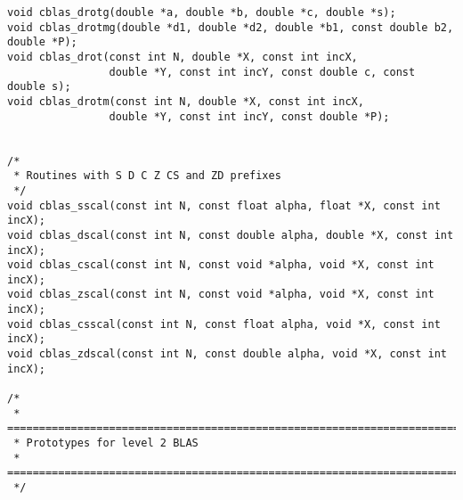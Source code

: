 \documentclass{article}
\begin{document}
\begin{Verbatim}[fontsize=\small,fontfamily=tt,fontshape=rm]
void cblas_drotg(double *a, double *b, double *c, double *s);
void cblas_drotmg(double *d1, double *d2, double *b1, const double b2, double *P);
void cblas_drot(const int N, double *X, const int incX,
                double *Y, const int incY, const double c, const double s);
void cblas_drotm(const int N, double *X, const int incX,
                double *Y, const int incY, const double *P);


/* 
 * Routines with S D C Z CS and ZD prefixes
 */
void cblas_sscal(const int N, const float alpha, float *X, const int incX);
void cblas_dscal(const int N, const double alpha, double *X, const int incX);
void cblas_cscal(const int N, const void *alpha, void *X, const int incX);
void cblas_zscal(const int N, const void *alpha, void *X, const int incX);
void cblas_csscal(const int N, const float alpha, void *X, const int incX);
void cblas_zdscal(const int N, const double alpha, void *X, const int incX);

/*
 * ===========================================================================
 * Prototypes for level 2 BLAS
 * ===========================================================================
 */


\end{Verbatim}
\end{document}
